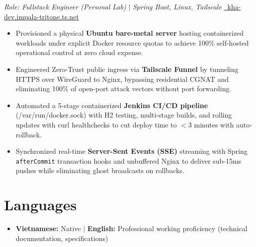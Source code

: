 \documentclass[a4paper,10pt]{article}
\begin{document}
\vspace{2pt}
\textit{Role: Fullstack Engineer (Personal Lab)} $\vert$ \textit{Spring Boot, Linux, Tailscale} \hfill \href{https://kha-dev.impala-tritone.ts.net/}{\faGlobe\ kha-dev.impala-tritone.ts.net} \\
\begin{itemize}[leftmargin=0.2in, itemsep=1.5pt, topsep=2pt]
    \item Provisioned a physical \textbf{Ubuntu bare-metal server} hosting containerized workloads under explicit Docker resource quotas to achieve 100\% self-hosted operational control at zero cloud expense.
    \item Engineered Zero-Trust public ingress via \textbf{Tailscale Funnel} by tunneling HTTPS over WireGuard to Nginx, bypassing residential CGNAT and eliminating 100\% of open-port attack vectors without port forwarding.
    \item Automated a 5-stage containerized \textbf{Jenkins CI/CD pipeline} (/var/run/docker.sock) with H2 testing, multi-stage builds, and rolling updates with curl healthchecks to cut deploy time to $<$3 minutes with auto-rollback.
    \item Synchronized real-time \textbf{Server-Sent Events (SSE)} streaming with Spring \texttt{afterCommit} transaction hooks and unbuffered Nginx to deliver sub-15ms pushes while eliminating ghost broadcasts on rollbacks.
\end{itemize}

\section{Languages}
\vspace{2pt}
\begin{itemize}[leftmargin=0.15in, label={}, itemsep=1.5pt, topsep=2pt]
    \item \textbf{Vietnamese:} Native $\vert$ \textbf{English:} Professional working proficiency (technical documentation, specifications)
\end{itemize}
\end{document}
